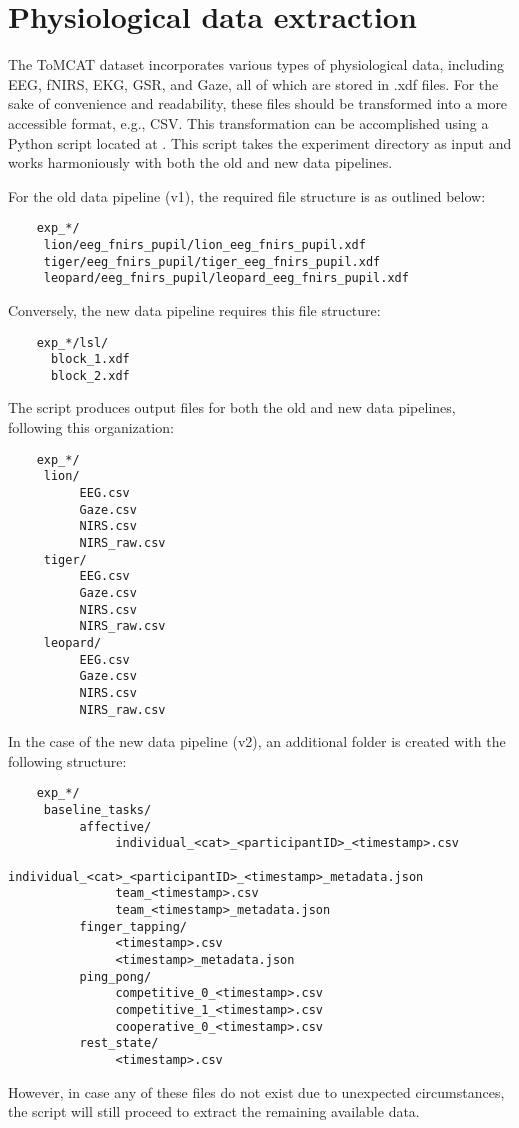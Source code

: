 \section{Physiological data extraction}

The ToMCAT dataset incorporates various types of physiological data, including
EEG, fNIRS, EKG, GSR, and Gaze, all of which are stored in .xdf files. For the
sake of convenience and readability, these files should be transformed into a
more accessible format, e.g., CSV. This transformation can be accomplished
using a Python script located at
.
This script takes the experiment directory as input and works harmoniously with
both the old and new data pipelines.

For the old data pipeline (v1), the required file structure is as outlined below:
%
\begin{verbatim}
    exp_*/
     lion/eeg_fnirs_pupil/lion_eeg_fnirs_pupil.xdf
     tiger/eeg_fnirs_pupil/tiger_eeg_fnirs_pupil.xdf
     leopard/eeg_fnirs_pupil/leopard_eeg_fnirs_pupil.xdf
\end{verbatim}
%
Conversely, the new data pipeline requires this file structure:
%
\begin{verbatim}
    exp_*/lsl/
      block_1.xdf
      block_2.xdf
\end{verbatim}
%
The script produces output files for both the old and new data pipelines, following this organization:
\begin{verbatim}
    exp_*/
     lion/
          EEG.csv
          Gaze.csv
          NIRS.csv
          NIRS_raw.csv
     tiger/
          EEG.csv
          Gaze.csv
          NIRS.csv
          NIRS_raw.csv
     leopard/
          EEG.csv
          Gaze.csv
          NIRS.csv
          NIRS_raw.csv

\end{verbatim}
%
In the case of the new data pipeline (v2), an additional folder is created with the following structure:
%
\begin{verbatim}
    exp_*/
     baseline_tasks/
          affective/
               individual_<cat>_<participantID>_<timestamp>.csv
               individual_<cat>_<participantID>_<timestamp>_metadata.json
               team_<timestamp>.csv
               team_<timestamp>_metadata.json
          finger_tapping/
               <timestamp>.csv
               <timestamp>_metadata.json
          ping_pong/
               competitive_0_<timestamp>.csv
               competitive_1_<timestamp>.csv
               cooperative_0_<timestamp>.csv
          rest_state/
               <timestamp>.csv

\end{verbatim}

However, in case any of these files do not exist due to unexpected
circumstances, the script will still proceed to extract the remaining available
data.
